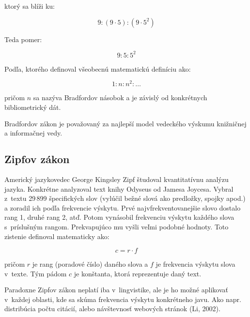 ktorý sa blíži ku:

\begin{equation}
\label{eq:bradfordov_zakon2}
9 : (9 \cdot 5) : (9 \cdot 5^2)
\end{equation}

Teda pomer:

\begin{equation}
\label{eq:bradfordov_zakon3}
9 : 5 : 5^2
\end{equation}

Podľa, ktorého definoval všeobecnú matematickú definíciu ako:

\begin{equation}
\label{eq:bradfordov_zakon4}
1 : n : n^2 : \dotso
\end{equation}

pričom $n$ sa nazýva Bradfordov násobok a je závislý od konkrétnych
bibliometrický dát.

Bradfordov zákon je považovaný za najlepší model vedeckého výskumu knižničnej a
informačnej vedy. \citep{Nicolaisen2007}


\subsection{Zipfov zákon}

Americký jazykovedec George Kingsley Zipf študoval kvantitatívnu analýzu jazyka.
Konkrétne analyzoval text knihy Odyseus od Jamesa Joycesa.  Vybral z~textu
29\,899 špecifických slov (vylúčil bežné slová ako predložky, spojky apod.)  a
zoradil ich podľa frekvencie výskytu.  Prvé najvfrekventovanejšie slovo dostalo
rang 1, druhé rang 2, atď.  Potom vynásobil frekvenciu výskytu každého slova
s~príslušným rangom.  Prekvapujúco mu vyšli veľmi podobné hodnoty.  Toto
zistenie definoval matematicky ako:

\begin{equation}
\label{eq:zipfov_zakon}
c = r \cdot f
\end{equation}

pričom $r$ je rang (poradové číslo) daného slova a $f$ je frekvencia výskytu
slova v~texte.  Tým pádom $c$ je konštanta, ktorá reprezentuje daný text.
\citep{Powers1998}

Paradoxne Zipfov zákon neplatí iba v~lingvistike, ale je ho možné aplikovať
v~každej oblasti, kde sa skúma frekvencia výskytu konkrétneho javu.  Ako
napr.\,distribúcia počtu citácií, alebo návštevnosť webových stránok (Li, 2002).

